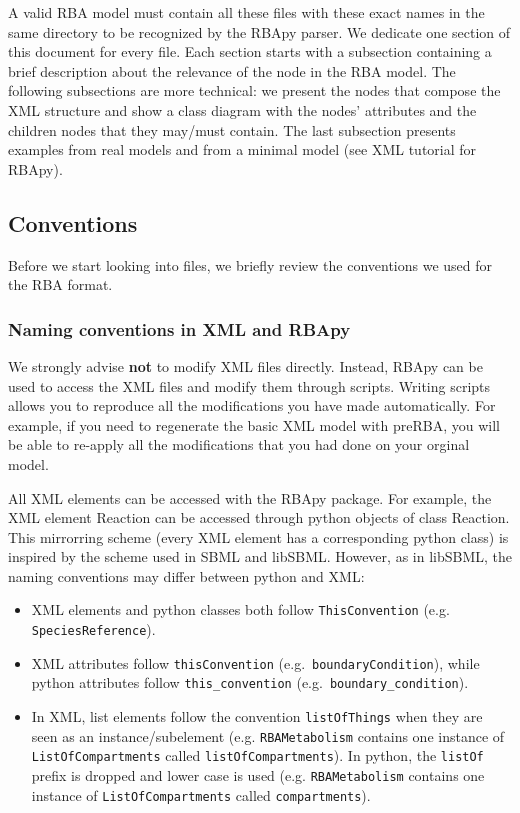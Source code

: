\documentclass[12pt]{scrartcl}
\begin{document}
A valid RBA model must contain all these files with these exact names in
the same directory to be recognized by the RBApy parser.
We dedicate one section of this document for every file.
Each section starts with a subsection containing a brief description
about the relevance of the node in the RBA model.
The following subsections are more technical:
we present the nodes that compose the XML structure
and show a class diagram with the nodes' attributes
and the children nodes that they may/must contain.
The last subsection presents examples from real models and from a minimal
model (see XML tutorial for RBApy).

\subsection{Conventions}

Before we start looking into files, we briefly review the conventions we used for the RBA format.

\subsubsection{Naming conventions in XML and RBApy}

We strongly advise \textbf{not} to modify XML files directly.
Instead, RBApy can be used to access the XML files and modify them through scripts.
Writing scripts allows you to reproduce all the modifications you have made automatically.
For example, if you need to regenerate the basic XML model with preRBA, you will be able
to re-apply all the modifications that you had done on your orginal model.

All XML elements can be accessed with the RBApy package.
For example, the XML element Reaction can be accessed through python objects
of class Reaction.
This mirrorring scheme (every XML element has a corresponding python class) is
inspired by the scheme used in SBML and libSBML.
However, as in libSBML, the naming conventions may differ between python and XML:

\begin{itemize}
  \item XML elements and python classes both follow \texttt{ThisConvention} (e.g. \texttt{SpeciesReference}).
  \item XML attributes follow \texttt{thisConvention} (e.g.\ \texttt{boundaryCondition}), while
    python attributes follow \texttt{this\_convention} (e.g.\ \texttt{boundary\_condition}).
  \item In XML, list elements follow the convention \texttt{listOfThings}
    when they are seen as an instance/subelement
    (e.g. \texttt{RBAMetabolism} contains one instance of \texttt{ListOfCompartments} called \texttt{listOfCompartments}).
    In python, the \texttt{listOf} prefix is dropped and lower case is used
    (e.g. \texttt{RBAMetabolism} contains one instance of \texttt{ListOfCompartments} called \texttt{compartments}).
\end{itemize}
\end{document}
